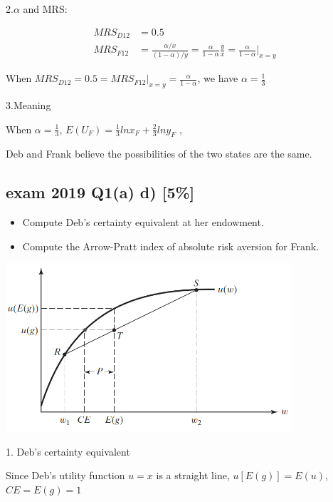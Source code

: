 \documentclass{article}
\begin{document}
2.$\alpha$ and MRS:

\begin{align*}
MRS_{D12} &= 0.5 \\
MRS_{F12} &= \frac{\alpha / x}{({1-\alpha})/ y} = \frac{\alpha}{1-\alpha} \frac{y}{x} =  \frac{\alpha}{1-\alpha} \bigg\vert_{x=y}
\end{align*}

When $MRS_{D12} = 0.5 = MRS_{F12}\bigg\vert_{x=y} = \frac{\alpha}{1-\alpha}$, we have $\alpha = \frac{1}{3}$

3.Meaning

When $\alpha = \frac{1}{3}$, $E(U_F) =\frac{1}{3} ln x_F +  \frac{2}{3} ln y_F$ ,

Deb and Frank believe the possibilities of the two states are the same.

\subsection{exam 2019 Q1(a) d) [5\%] }

\begin{itemize}
\item Compute Deb's certainty equivalent at her endowment. 
\item Compute the Arrow-Pratt index of absolute risk aversion for Frank.
\end{itemize}

\begin{mdframed}[backgroundcolor=blue!20,linecolor=white]
\vspace{2mm}
{\centering
\includegraphics[width=0.8\textwidth]{4.cereq}
\label{cf}}
\vspace{2mm}
\end{mdframed}

1. Deb's certainty equivalent

Since Deb's utility function $u = x$ is a straight line, $u[E(g)] = E(u)$,
$CE =  E(g) = 1$
\end{document}
